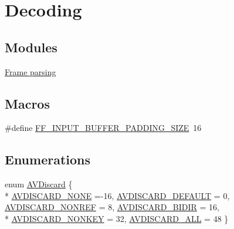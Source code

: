 \hypertarget{group__lavc__decoding}{}\section{Decoding}
\label{group__lavc__decoding}
\subsection*{Modules}
\begin{DoxyCompactItemize}
\item 
\hyperlink{group__lavc__parsing}{Frame parsing}
\end{DoxyCompactItemize}
\subsection*{Macros}
\begin{DoxyCompactItemize}
\item 
\#define \hyperlink{group__lavc__decoding_ga9207dd7cb4ee4416f8fd1f7a63af34b7}{F\+F\+\_\+\+I\+N\+P\+U\+T\+\_\+\+B\+U\+F\+F\+E\+R\+\_\+\+P\+A\+D\+D\+I\+N\+G\+\_\+\+S\+I\+ZE}~16
\end{DoxyCompactItemize}
\subsection*{Enumerations}
\begin{DoxyCompactItemize}
\item 
enum \hyperlink{group__lavc__decoding_ga352363bce7d3ed82c101b3bc001d1c16}{A\+V\+Discard} \{ \\*
\hyperlink{group__lavc__decoding_gga352363bce7d3ed82c101b3bc001d1c16a93d0436f7651b58debe3f995e2582dcd}{A\+V\+D\+I\+S\+C\+A\+R\+D\+\_\+\+N\+O\+NE} =-\/16, 
\hyperlink{group__lavc__decoding_gga352363bce7d3ed82c101b3bc001d1c16a81453d8c452e8ee794daf7fde1c80b5b}{A\+V\+D\+I\+S\+C\+A\+R\+D\+\_\+\+D\+E\+F\+A\+U\+LT} = 0, 
\hyperlink{group__lavc__decoding_gga352363bce7d3ed82c101b3bc001d1c16ac5a5a87ffcd6fb2362ac18449d29bde8}{A\+V\+D\+I\+S\+C\+A\+R\+D\+\_\+\+N\+O\+N\+R\+EF} = 8, 
\hyperlink{group__lavc__decoding_gga352363bce7d3ed82c101b3bc001d1c16a776541ad00a4f13c3fdcd363988bffb3}{A\+V\+D\+I\+S\+C\+A\+R\+D\+\_\+\+B\+I\+D\+IR} = 16, 
\\*
\hyperlink{group__lavc__decoding_gga352363bce7d3ed82c101b3bc001d1c16a31c8164477d9f571f82003065d2ab6f1}{A\+V\+D\+I\+S\+C\+A\+R\+D\+\_\+\+N\+O\+N\+K\+EY} = 32, 
\hyperlink{group__lavc__decoding_gga352363bce7d3ed82c101b3bc001d1c16a07517e3890ba7e19a612945483dc066a}{A\+V\+D\+I\+S\+C\+A\+R\+D\+\_\+\+A\+LL} = 48
 \}
\end{DoxyCompactItemize}
